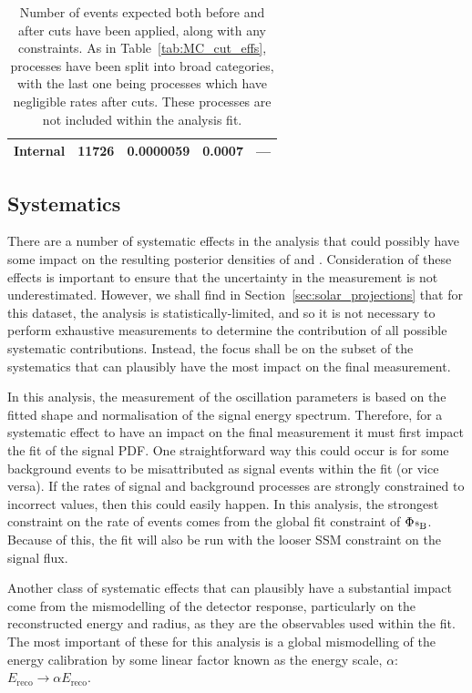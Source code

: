 \begin{table}
\begin{center}
\begin{tabulary}{\textwidth}{c R R R R}
            Internal       & \num{11726}&0.0000059& 0.0007& --- \\
            \hline
        \end{tabulary}
    \end{center}
    \caption[Number of events expected both before and after cuts have been applied, along with any constraints.]
    {Number of events expected both before and after cuts have been applied, along with any constraints. As in Table~\ref{tab:MC_cut_effs}, processes have been split into broad categories, with the last one being processes which have negligible rates after cuts. These processes are not included within the analysis fit.}
    \label{tab:MC_expected_rates_constraints}
\end{table}

\subsection{Systematics}
There are a number of systematic effects in the analysis that could possibly have some impact on the resulting posterior densities of \tonetwo{} and \dmsq{}. Consideration of these effects is important to ensure that the uncertainty in the measurement is not underestimated. However, we shall find in Section~\ref{sec:solar_projections} that for this dataset, the analysis is statistically-limited, and so it is not necessary to perform exhaustive measurements to determine the contribution of all possible systematic contributions. Instead, the focus shall be on the subset of the systematics that can plausibly have the most impact on the final measurement.

In this analysis, the measurement of the oscillation parameters is based on the fitted shape and normalisation of the \beight{} signal energy spectrum. Therefore, for a systematic effect to have an impact on the final measurement it must first impact the fit of the signal PDF. One straightforward way this could occur is for some background events to be misattributed as signal events within the fit (or vice versa). If the rates of signal and background processes are strongly constrained to incorrect values, then this could easily happen. In this analysis, the strongest constraint on the rate of events comes from the global fit constraint of $\Phi_{\beight{}}$. Because of this, the fit will also be run with the looser SSM constraint on the signal flux.

Another class of systematic effects that can plausibly have a substantial impact come from the mismodelling of the detector response, particularly on the reconstructed energy and radius, as they are the observables used within the fit. The most important of these for this analysis is a global mismodelling of the energy calibration by some linear factor known as the energy scale, $\alpha$: $E_{\mathrm{reco}}\to\alpha E_{\mathrm{reco}}$.

